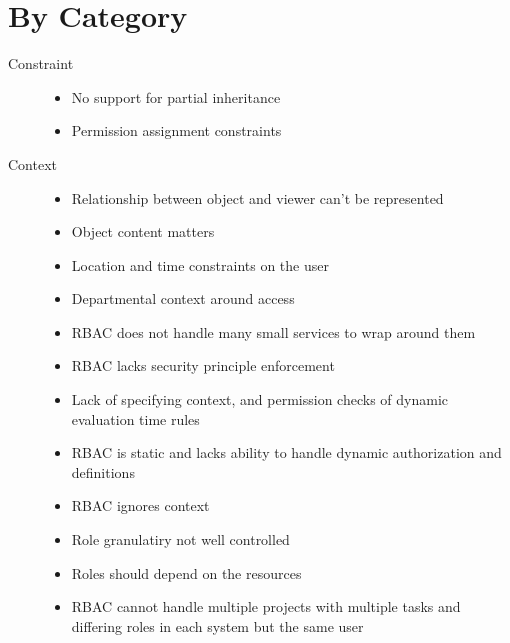 \documentclass[letterpaper,10pt,english]{sphinxmanual}
\begin{document}
\section{By Category}
\label{research_questions/RQ_2:by-category}\begin{description}
\item[{Constraint}] \leavevmode\begin{itemize}
\item {} 
No support for partial inheritance

\item {} 
Permission assignment constraints

\end{itemize}

\item[{Context}] \leavevmode\begin{itemize}
\item {} 
Relationship between object and viewer can't be represented

\item {} 
Object content matters

\item {} 
Location and time constraints on the user

\item {} 
Departmental context around access

\item {} 
RBAC does not handle many small services to wrap around them

\item {} 
RBAC lacks security principle enforcement

\item {} 
Lack of specifying context, and permission checks of dynamic evaluation time rules

\item {} 
RBAC is static and lacks ability to handle dynamic authorization and definitions

\item {} 
RBAC ignores context

\item {} 
Role granulatiry not well controlled

\item {} 
Roles should depend on the resources

\item {} 
RBAC cannot handle multiple projects with multiple tasks and differing roles in each system but the same user


\end{itemize}
\end{description}
\end{document}
